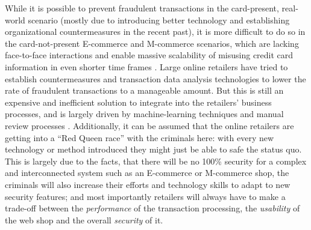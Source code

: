 While it is possible to prevent fraudulent transactions in the card-present, real-world scenario (mostly due to introducing better technology and establishing organizational countermeasures in the recent past), it is more difficult to do so in the card-not-present \gls{E-commerce} and \gls{M-commerce} scenarios, which are lacking face-to-face interactions and enable massive scalability of misusing credit card information in even shorter time frames \citep{Lewis2015}. Large online retailers have tried to establish countermeasures and transaction data analysis technologies to lower the rate of fraudulent transactions to a manageable amount. But this is still an expensive and inefficient solution to integrate into the retailers’ business processes, and is largely driven by machine-learning techniques and manual review processes \citep{Brachmann2015}. Additionally, it can be assumed that the online retailers are getting into a ``Red Queen race'' with the criminals here: with every new technology or method introduced they might just be able to safe the status quo. This is largely due to the facts, that there will be no 100\% security for a complex and interconnected system such as an \gls{E-commerce} or \gls{M-commerce} shop, the criminals will also increase their efforts and technology skills to adapt to new security features; and most importantly retailers will always have to make a trade-off between the \textit{performance} of the transaction processing, the \textit{usability} of the web shop and the overall \textit{security} of it.


